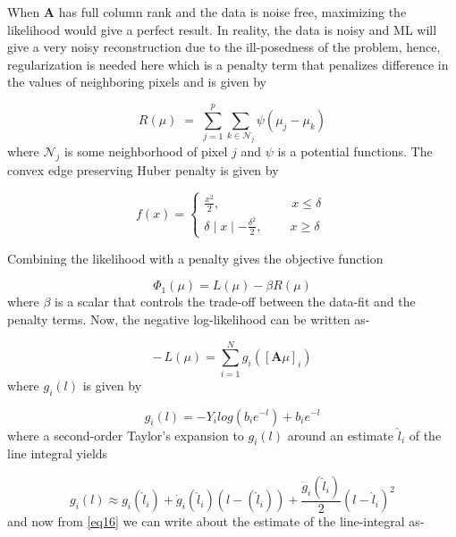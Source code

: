 When $\textbf{A}$ has full column rank and the data is noise free, maximizing the likelihood would give a perfect result. In reality, the data is noisy and ML will give a very noisy reconstruction due to the ill-posedness of the problem, hence, regularization is needed here which is a penalty term that penalizes difference in the values of neighboring pixels and is given by

\begin{equation}
\label{eq44}
R (\mu) \; = \; \sum\limits_{j=1}^p \sum\limits_{k \in \mathcal{N}_j} \psi (\mu_j - \mu_k)
\end{equation} where $\mathcal{N}_j$ is some neighborhood of pixel $j$ and $\psi$ is a potential functions. The convex edge preserving Huber penalty is given by 

\[
    f(x)= 
\begin{cases}
    \frac{x^2}{2}, \; \; \;  \; \; \; \; \; \; \; \; \; \; \;  \; \; \, \; \; \; \;  x \leq \delta\    \\    \delta \mid x \mid - \frac{\delta^{2}}{2} , \; \; \; \; \; \; \; \;   x \geqslant \delta
\end{cases}
\]

Combining the likelihood with a penalty gives the objective function

\begin{equation}
\label{eq45}
\Phi_1(\mu) = L(\mu)-\beta R(\mu)
\end{equation} where $\beta$ is a scalar that controls the trade-off between the data-fit and the penalty terms. Now, the negative log-likelihood can be written as-

\begin{equation}
\label{eq46}
-\,L(\mu) = \sum\limits_{i=1}^N g_i \left( \left[ \textbf{A}\mu \right]_i \right)
\end{equation} where $g_i(l)$ is given by

\begin{equation}
\label{eq47}
g_i(l) = - Y_i log\left( b_i e^{-l}\right) + b_i e^{-l}
\end{equation} where a second-order Taylor's expansion to $g_i(l)$ around an estimate $\widehat{l}_i$ of the line integral yields

\begin{equation}
\label{eq48}
g_i(l) \approx g_i(\widehat{l}_i) + \dot{g}_i(\widehat{l}_i) (l-(\widehat{l}_i))+ \frac{\ddot{g}_i (\widehat{l}_i)}{2}(l-\widehat{l}_i)^2
\end{equation} and now from \ref{eq16} we can write about the estimate of the line-integral as-

